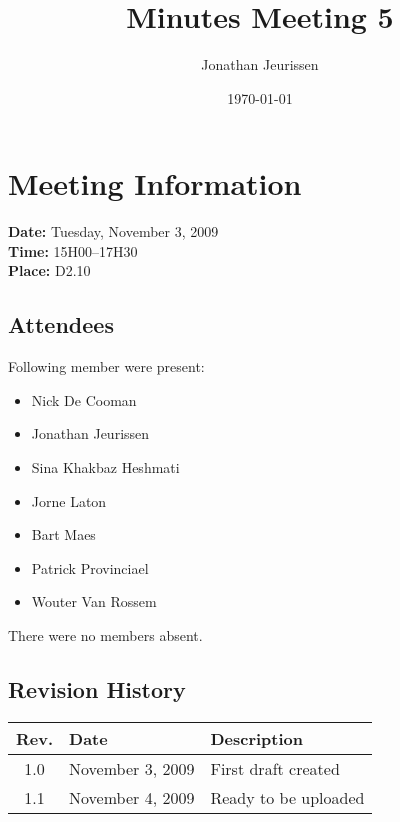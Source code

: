 \documentclass[a4paper, 12pt]{article}
\begin{document}
\title{Minutes Meeting 5}
\author{Jonathan Jeurissen}
\date{\today}

\maketitle	
	\section{Meeting Information}
			\textbf{Date:} Tuesday, November 3, 2009\\
			\textbf{Time:} 15H00--17H30\\
			\textbf{Place:} D2.10\\
		\subsection{Attendees}
Following member were present:
			\begin{itemize}
				\item Nick De Cooman
				\item Jonathan Jeurissen
				\item Sina Khakbaz Heshmati
				\item Jorne Laton
				\item Bart Maes
				\item Patrick Provinciael
				\item Wouter Van Rossem
			\end{itemize}
There were no members absent.
		\subsection{Revision History}
			\begin{tabular}{c | l | l }
				\textbf{Rev.} & \textbf{Date} & \textbf{Description} \\
				\hline
				1.0 & November 3, 2009 & First draft created \\
				1.1 & November 4, 2009 & Ready to be uploaded \\
			\end{tabular}		
\end{document}
